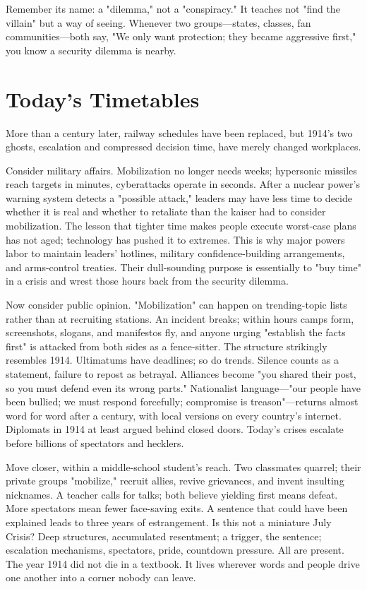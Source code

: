 Remember its name: a "dilemma," not a "conspiracy." It teaches not "find the villain" but a way of seeing. Whenever two groups---states, classes, fan communities---both say, "We only want protection; they became aggressive first," you know a security dilemma is nearby.

\section{Today's Timetables}
More than a century later, railway schedules have been replaced, but 1914's two ghosts, escalation and compressed decision time, have merely changed workplaces.

Consider military affairs. Mobilization no longer needs weeks; hypersonic missiles reach targets in minutes, cyberattacks operate in seconds. After a nuclear power's warning system detects a "possible attack," leaders may have less time to decide whether it is real and whether to retaliate than the kaiser had to consider mobilization. The lesson that tighter time makes people execute worst-case plans has not aged; technology has pushed it to extremes. This is why major powers labor to maintain leaders' hotlines, military confidence-building arrangements, and arms-control treaties. Their dull-sounding purpose is essentially to "buy time" in a crisis and wrest those hours back from the security dilemma.

Now consider public opinion. "Mobilization" can happen on trending-topic lists rather than at recruiting stations. An incident breaks; within hours camps form, screenshots, slogans, and manifestos fly, and anyone urging "establish the facts first" is attacked from both sides as a fence-sitter. The structure strikingly resembles 1914. Ultimatums have deadlines; so do trends. Silence counts as a statement, failure to repost as betrayal. Alliances become "you shared their post, so you must defend even its wrong parts." Nationalist language---"our people have been bullied; we must respond forcefully; compromise is treason"---returns almost word for word after a century, with local versions on every country's internet. Diplomats in 1914 at least argued behind closed doors. Today's crises escalate before billions of spectators and hecklers.

Move closer, within a middle-school student's reach. Two classmates quarrel; their private groups "mobilize," recruit allies, revive grievances, and invent insulting nicknames. A teacher calls for talks; both believe yielding first means defeat. More spectators mean fewer face-saving exits. A sentence that could have been explained leads to three years of estrangement. Is this not a miniature July Crisis? Deep structures, accumulated resentment; a trigger, the sentence; escalation mechanisms, spectators, pride, countdown pressure. All are present. The year 1914 did not die in a textbook. It lives wherever words and people drive one another into a corner nobody can leave.

